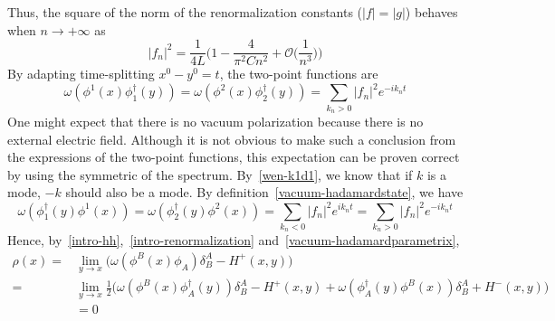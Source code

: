 Thus, the square of the norm of the renormalization constants ($|f| = |g|$) behaves when $n\rightarrow +\infty$ as
\begin{equation*}
|f_n|^2 = 
\frac{1}{4L}\Big( 1 - \frac{4}{\pi^2C n^2} + \mathcal{O}\big(\frac{1}{n^3}\big) \Big)
\end{equation*}
By adapting time-splitting $x^0 - y^0 = t$, the two-point functions are
\begin{equation*}
\omega(\phi^1(x)\phi^\dagger_1(y)) = \omega(\phi^2(x)\phi^\dagger_2(y)) = 
 \sum_{k_n>0} |f_n|^2 e^{-ik_nt}
\end{equation*} 
One might expect that there is no vacuum polarization because there is no external electric field. 
Although it is not obvious to make such a conclusion from the expressions of the two-point functions, 
this expectation can be proven correct by using the symmetric of the spectrum.
By~\cref{wen-k1d1}, we know that if $k$ is a mode, $-k$ should also be a mode.
By definition~\cref{vacuum-hadamardstate}, we have
\begin{equation*}
\omega(\phi_1^\dagger(y)\phi^1(x)) = \omega(\phi_2^\dagger(y)\phi^2(x)) = 
 \sum_{k_n< 0} |f_n|^2 e^{ik_nt}
= \sum_{k_n>0} |f_n|^2 e^{-ik_nt}
\end{equation*}
Hence, by~\cref{intro-hh},~\cref{intro-renormalization} and~\cref{vacuum-hadamardparametrix}, 
\begin{equation*}
\begin{split}
\rho(x) = & \lim_{y\rightarrow x}\big(\omega(\phi^B(x)\phi_A)\delta^A_B - H^+(x,y)\big) \\
= & \lim_{y\rightarrow x}\frac{1}{2}\big( \omega(\phi^B(x)\phi_A^\dagger(y))\delta^A_B-H^+(x,y) + \omega(\phi_A^\dagger(y)\phi^B(x))\delta^A_B + H^-(x,y) \big)  \\
& = 0
\end{split} 
\end{equation*}
